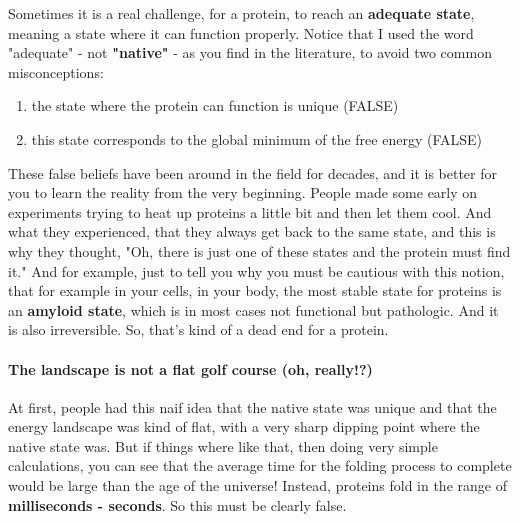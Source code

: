 \noindent Sometimes it is a real challenge, for a protein, to reach an \textbf{adequate state}, meaning a state where it can function properly. Notice that I used the word "adequate" - not \textbf{"native"} - as you find in the literature, to avoid two common misconceptions:

\begin{enumerate}
    \item the state where the protein can function is unique (FALSE)
    \item this state corresponds to the global minimum of the free energy (FALSE)
\end{enumerate}
These false beliefs have been around in the field for decades, and it is better for you to learn the reality from the very beginning. People made some early on experiments trying to heat up proteins a little bit and then let them cool. And what they experienced, that they always get back to the same state, and this is why they thought, "Oh, there is just one of these states and the protein must find it." And for example, just to tell you why you must be cautious with this notion, that for example in your cells, in your body, the most stable state for proteins is an \textbf{amyloid state}, which is in most cases not functional but pathologic. And it is also irreversible. So, that’s kind of a dead end for a protein. 

\paragraph{The landscape is not a flat golf course (oh, really!?)}
At first, people had this naif idea that the native state was unique and that the energy landscape was kind of flat, with a very sharp dipping point where the native state was. But if things where like that, then doing very simple calculations, you can see that the average time for the folding process to complete would be large than the age of the universe! Instead, proteins fold in the range of \textbf{milliseconds - seconds}. So this must be clearly false. 

